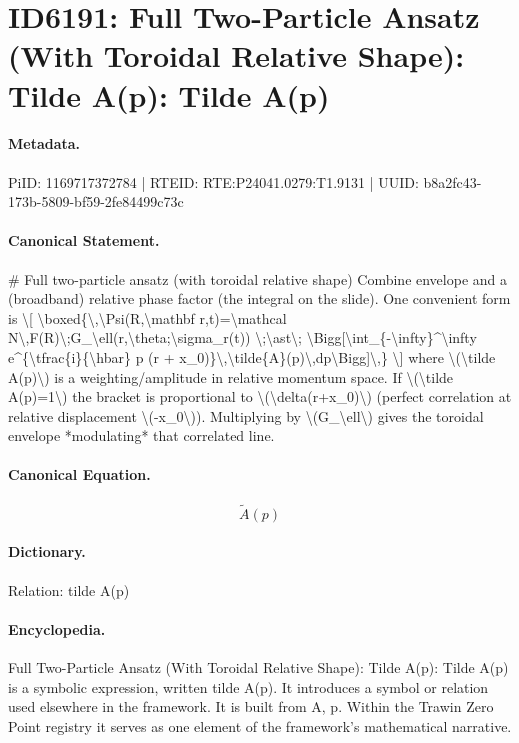 \section*{ID6191: Full Two-Particle Ansatz (With Toroidal Relative Shape): Tilde A(p): Tilde A(p)}
\paragraph{Metadata.}
PiID: 1169717372784 | RTEID: RTE:P24041.0279:T1.9131 | UUID: b8a2fc43-173b-5809-bf59-2fe84499c73c

\paragraph{Canonical Statement.}
\# Full two-particle ansatz (with toroidal relative shape) Combine envelope and a (broadband) relative phase factor (the integral on the slide). One convenient form is \textbackslash{}[ \textbackslash{}boxed\{\textbackslash{},\textbackslash{}Psi(R,\textbackslash{}mathbf r,t)=\textbackslash{}mathcal N\textbackslash{},F(R)\textbackslash{};G\_\textbackslash{}ell(r,\textbackslash{}theta;\textbackslash{}sigma\_r(t)) \textbackslash{};\textbackslash{}ast\textbackslash{}; \textbackslash{}Bigg[\textbackslash{}int\_\{-\textbackslash{}infty\}\textasciicircum{}\textbackslash{}infty e\textasciicircum{}\{\textbackslash{}tfrac\{i\}\{\textbackslash{}hbar\} p (r + x\_0)\}\textbackslash{},\textbackslash{}tilde\{A\}(p)\textbackslash{},dp\textbackslash{}Bigg]\textbackslash{},\} \textbackslash{}] where \textbackslash{}(\textbackslash{}tilde A(p)\textbackslash{}) is a weighting/amplitude in relative momentum space. If \textbackslash{}(\textbackslash{}tilde A(p)=1\textbackslash{}) the bracket is proportional to \textbackslash{}(\textbackslash{}delta(r+x\_0)\textbackslash{}) (perfect correlation at relative displacement \textbackslash{}(-x\_0\textbackslash{})). Multiplying by \textbackslash{}(G\_\textbackslash{}ell\textbackslash{}) gives the toroidal envelope *modulating* that correlated line.

\paragraph{Canonical Equation.}
\[
\tilde A(p)
\]

\paragraph{Dictionary.}
Relation: tilde A(p)

\paragraph{Encyclopedia.}
Full Two-Particle Ansatz (With Toroidal Relative Shape): Tilde A(p): Tilde A(p) is a symbolic expression, written tilde A(p). It introduces a symbol or relation used elsewhere in the framework. It is built from A, p. Within the Trawin Zero Point registry it serves as one element of the framework's mathematical narrative.
